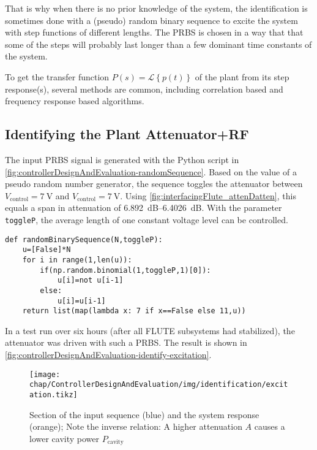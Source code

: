 That is why when there is no prior knowledge of the system, the identification is sometimes done with a (pseudo) random binary sequence to excite the system with step functions of different lengths. The PRBS is chosen in a way that that some of the steps will probably last longer than a few dominant time constants of the system. 

To get the transfer function $P(s)=\mathcal{L}\left\{p(t)\right\}$ of the plant from its step response(s), several methods are common, including correlation based and frequency response based algorithms.

\subsection{Identifying the Plant Attenuator+RF}
The input PRBS signal is generated with the Python script in \autoref{fig:controllerDesignAndEvaluation-randomSequence}.
Based on the value of a pseudo random number generator, the sequence toggles the attenuator between $V_\text{control}=\SI{7}{\volt}$ and $V_\text{control}=\SI{7}{\volt}$.
Using \autoref{fig:interfacingFlute_attenDatten}, this equals a span in attenuation of \SIrange{6.892}{6.4026}{\dB}.
With the parameter \texttt{toggleP}, the average length of one constant voltage level can be controlled. 

\begin{lstlisting}[style=python,caption = Function to get a pseudo random binary sequence, label = lst:controllerDesignAndEvaluation-randomSequence]
def randomBinarySequence(N,toggleP):
    u=[False]*N
    for i in range(1,len(u)):
        if(np.random.binomial(1,toggleP,1)[0]):
            u[i]=not u[i-1]
        else:
            u[i]=u[i-1]
    return list(map(lambda x: 7 if x==False else 11,u))
\end{lstlisting}

In a test run over six hours (after all FLUTE subsystems had stabilized), the attenuator was driven with such a PRBS. The result is shown in \autoref{fig:controllerDesignAndEvaluation-identify-excitation}.

\begin{figure}[tb]
	\centering
	\texttt{[image: chap/ControllerDesignAndEvaluation/img/identification/excitation.tikz]}
	\caption{Section of the input sequence (blue) and the system response (orange); Note the inverse relation: A higher attenuation $A$ causes a lower cavity power $P_\text{cavity}$}
	\label{fig:controllerDesignAndEvaluation-identify-excitation}
\end{figure}

